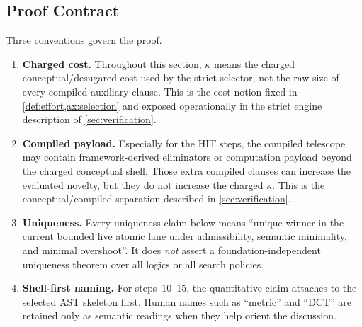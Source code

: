 \documentclass[11pt,a4paper]{article}
\theoremstyle{plain}
\theoremstyle{definition}
\theoremstyle{remark}
\begin{document}
\let\genesissequenceorigparagraph\paragraph
\renewcommand{\paragraph}[1]{\par\medskip\noindent\textbf{#1.}\ }

\subsection{Proof Contract}
\label{subsec:genesis-proof-contract}

Three conventions govern the proof.

\begin{enumerate}[nosep]
    \item \textbf{Charged cost.} Throughout this section, $\kappa$ means the
    charged conceptual/desugared cost used by the strict selector, not the raw
    size of every compiled auxiliary clause.
    This is the cost notion fixed in \cref{def:effort,ax:selection} and exposed
    operationally in the strict engine description of
    \cref{sec:verification}.
    \item \textbf{Compiled payload.} Especially for the HIT steps, the compiled
    telescope may contain framework-derived eliminators or computation payload
    beyond the charged conceptual shell.
    Those extra compiled clauses can increase the evaluated novelty, but they do
    not increase the charged $\kappa$.
    This is the conceptual/compiled separation described in
    \cref{sec:verification}.
    \item \textbf{Uniqueness.} Every uniqueness claim below means
    ``unique winner in the current bounded live atomic lane under admissibility,
    semantic minimality, and minimal overshoot''.
    It does \emph{not} assert a foundation-independent uniqueness theorem over
    all logics or all search policies.
    \item \textbf{Shell-first naming.} For steps~10--15, the quantitative claim
    attaches to the selected AST skeleton first.
    Human names such as ``metric'' and ``DCT'' are retained only as semantic
    readings when they help orient the discussion.
\end{enumerate}
\end{document}
